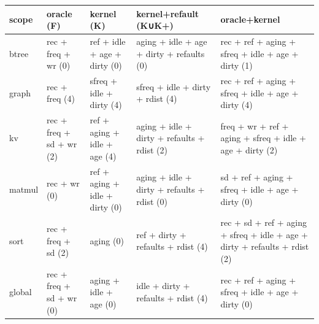 \documentclass[10pt,a4paper]{article}
\begin{document}
\begin{center}\footnotesize
\begin{tabularx}{\linewidth}{llXXX}
\toprule
\textbf{scope} & \textbf{oracle (F)} & \textbf{kernel (K)} & \textbf{kernel+refault (K∪K+)} & \textbf{oracle+kernel} \\ \midrule
btree & rec + freq + wr (0) & ref + idle + age + dirty (0) & aging + idle + age + dirty + refaults (0) & rec + ref + aging + sfreq + idle + age + dirty (1) \\
graph & rec + freq (4) & sfreq + idle + dirty (4) & sfreq + idle + dirty + rdist (4) & rec + ref + aging + sfreq + idle + age + dirty (4) \\
kv & rec + freq + sd + wr (2) & ref + aging + idle + age (4) & aging + idle + dirty + refaults + rdist (2) & freq + wr + ref + aging + sfreq + idle + age + dirty (2) \\
matmul & rec + wr (0) & ref + aging + idle + dirty (0) & aging + idle + dirty + refaults + rdist (0) & sd + ref + aging + sfreq + idle + age + dirty (0) \\
sort & rec + freq + sd (2) & aging (0) & ref + dirty + refaults + rdist (4) & rec + sd + ref + aging + sfreq + idle + age + dirty + refaults + rdist (2) \\
global & rec + freq + sd + wr (0) & aging + idle + age (0) & idle + dirty + refaults + rdist (4) & rec + ref + aging + sfreq + idle + age + dirty (0) \\
\bottomrule
\end{tabularx}
\end{center}
\end{document}
